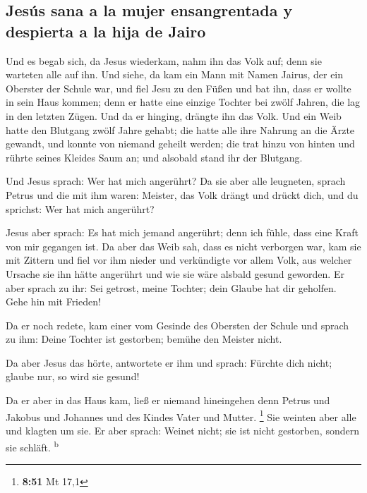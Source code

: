 \hypertarget{jesuxfas-sana-a-la-mujer-ensangrentada-y-despierta-a-la-hija-de-jairo}{%
\subsection{Jesús sana a la mujer ensangrentada y despierta a la hija de
Jairo}\label{jesuxfas-sana-a-la-mujer-ensangrentada-y-despierta-a-la-hija-de-jairo}}

 Und es begab sich, da Jesus wiederkam, nahm ihn das Volk
auf; denn sie warteten alle auf ihn.  Und siehe, da kam
ein Mann mit Namen Jairus, der ein Oberster der Schule war, und fiel
Jesu zu den Füßen und bat ihn, dass er wollte in sein Haus kommen;
 denn er hatte eine einzige Tochter bei zwölf Jahren, die
lag in den letzten Zügen. Und da er hinging, drängte ihn das Volk.
 Und ein Weib hatte den Blutgang zwölf Jahre gehabt; die
hatte alle ihre Nahrung an die Ärzte gewandt, und konnte von niemand
geheilt werden;  die trat hinzu von hinten und rührte
seines Kleides Saum an; und alsobald stand ihr der Blutgang.

 Und Jesus sprach: Wer hat mich angerührt? Da sie aber
alle leugneten, sprach Petrus und die mit ihm waren: Meister, das Volk
drängt und drückt dich, und du sprichst: Wer hat mich angerührt?

 Jesus aber sprach: Es hat mich jemand angerührt; denn
ich fühle, dass eine Kraft von mir gegangen ist.  Da aber
das Weib sah, dass es nicht verborgen war, kam sie mit Zittern und fiel
vor ihm nieder und verkündigte vor allem Volk, aus welcher Ursache sie
ihn hätte angerührt und wie sie wäre alsbald gesund geworden.
 Er aber sprach zu ihr: Sei getrost, meine Tochter; dein
Glaube hat dir geholfen. Gehe hin mit Frieden!

 Da er noch redete, kam einer vom Gesinde des Obersten
der Schule und sprach zu ihm: Deine Tochter ist gestorben; bemühe den
Meister nicht.

 Da aber Jesus das hörte, antwortete er ihm und sprach:
Fürchte dich nicht; glaube nur, so wird sie gesund!

 Da er aber in das Haus kam, ließ er niemand hineingehen
denn Petrus und Jakobus und Johannes und des Kindes Vater und Mutter.
\footnote{\textbf{8:51} Mt 17,1}  Sie weinten aber alle
und klagten um sie. Er aber sprach: Weinet nicht; sie ist nicht
gestorben, sondern sie schläft. \textsuperscript{b}


